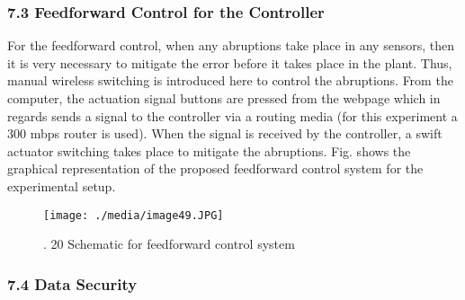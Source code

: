 \subsubsection*{7.3 Feedforward Control for the Controller }
\begin{justify}
For the feedforward control, when any abruptions take place in any sensors, then it is very necessary to mitigate the error before it takes place in the plant. Thus, manual wireless switching is introduced here to control the abruptions. From the computer, the actuation signal buttons are pressed from the webpage which in regards sends a signal to the controller via\textit{ }a routing media (for this experiment a 300 mbps router is used). When the signal is received by the controller, a swift actuator switching takes place to mitigate the abruptions. Fig. shows the graphical representation of the proposed feedforward control system for the experimental setup.
\end{justify}\par




\begin{figure}[H]
	\begin{Center}
		\texttt{[image: ./media/image49.JPG]}
		\caption{. 20 Schematic for feedforward control system}
		\label{fig:_20_Schematic_for_feedforward_control_system}
	\end{Center}
\end{figure}



\par

\par


\vspace{\baselineskip}
\subsubsection*{7.4 Data Security }
